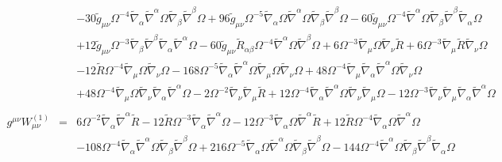 \documentclass[10pt,letterpaper]{article}
\numberwithin{equation}{section}
\begin{document}
\begin{eqnarray}
&& - 30 \tilde g_{\mu \nu } \Omega^{-4} \tilde\nabla_{\alpha }\tilde\nabla^{\alpha }\Omega \tilde\nabla_{\beta }\tilde\nabla^{\beta }\Omega + 96 \tilde g_{\mu \nu } \Omega^{-5} \tilde\nabla_{\alpha }\Omega \tilde\nabla^{\alpha }\Omega \tilde\nabla_{\beta }\tilde\nabla^{\beta }\Omega - 60 \tilde g_{\mu \nu } \Omega^{-4} \tilde\nabla^{\alpha }\Omega \tilde\nabla_{\beta }\tilde\nabla^{\beta }\tilde\nabla_{\alpha }\Omega \nonumber \\ 
&& + 12 \tilde g_{\mu \nu } \Omega^{-3} \tilde\nabla_{\beta }\tilde\nabla^{\beta }\tilde\nabla_{\alpha }\tilde\nabla^{\alpha }\Omega - 60 \tilde g_{\mu \nu } \tilde R_{\alpha \beta } \Omega^{-4} \tilde\nabla^{\alpha }\Omega \tilde\nabla^{\beta }\Omega + 6 \Omega^{-3} \tilde\nabla_{\mu }\Omega \tilde\nabla_{\nu }\tilde R + 6 \Omega^{-3} \tilde\nabla_{\mu }\tilde R \tilde\nabla_{\nu }\Omega \nonumber \\ 
&& - 12 \tilde R \Omega^{-4} \tilde\nabla_{\mu }\Omega \tilde\nabla_{\nu }\Omega - 168 \Omega^{-5} \tilde\nabla_{\alpha }\tilde\nabla^{\alpha }\Omega \tilde\nabla_{\mu }\Omega \tilde\nabla_{\nu }\Omega + 48 \Omega^{-4} \tilde\nabla_{\mu }\tilde\nabla_{\alpha }\tilde\nabla^{\alpha }\Omega \tilde\nabla_{\nu }\Omega \nonumber \\ 
&& + 48 \Omega^{-4} \tilde\nabla_{\mu }\Omega \tilde\nabla_{\nu }\tilde\nabla_{\alpha }\tilde\nabla^{\alpha }\Omega - 2 \Omega^{-2} \tilde\nabla_{\nu }\tilde\nabla_{\mu }\tilde R + 12 \Omega^{-4} \tilde\nabla_{\alpha }\tilde\nabla^{\alpha }\Omega \tilde\nabla_{\nu }\tilde\nabla_{\mu }\Omega - 12 \Omega^{-3} \tilde\nabla_{\nu }\tilde\nabla_{\mu }\tilde\nabla_{\alpha }\tilde\nabla^{\alpha }\Omega 
\\ \nonumber\\
g^{\mu\nu}W_{\mu\nu}^{(1)}&=& 6 \Omega^{-2} \tilde\nabla_{\alpha }\tilde \nabla^{\alpha }\tilde R - 12 \tilde R \Omega^{-3} \tilde\nabla_{\alpha }\tilde \nabla^{\alpha }\Omega - 12 \Omega^{-3} \tilde\nabla_{\alpha }\Omega \tilde \nabla^{\alpha }\tilde R + 12 \tilde R \Omega^{-4} \tilde\nabla_{\alpha }\Omega \tilde \nabla^{\alpha }\Omega \nonumber \\ 
&& - 108 \Omega^{-4} \tilde\nabla_{\alpha }\tilde \nabla^{\alpha }\Omega \tilde\nabla_{\beta }\tilde \nabla^{\beta }\Omega + 216 \Omega^{-5} \tilde\nabla_{\alpha }\Omega \tilde \nabla^{\alpha }\Omega \tilde\nabla_{\beta }\tilde \nabla^{\beta }\Omega - 144 \Omega^{-4} \tilde \nabla^{\alpha }\Omega \tilde\nabla_{\beta }\tilde \nabla^{\beta }\tilde\nabla_{\alpha }\Omega \nonumber \\ 

\end{eqnarray}
\end{document}
